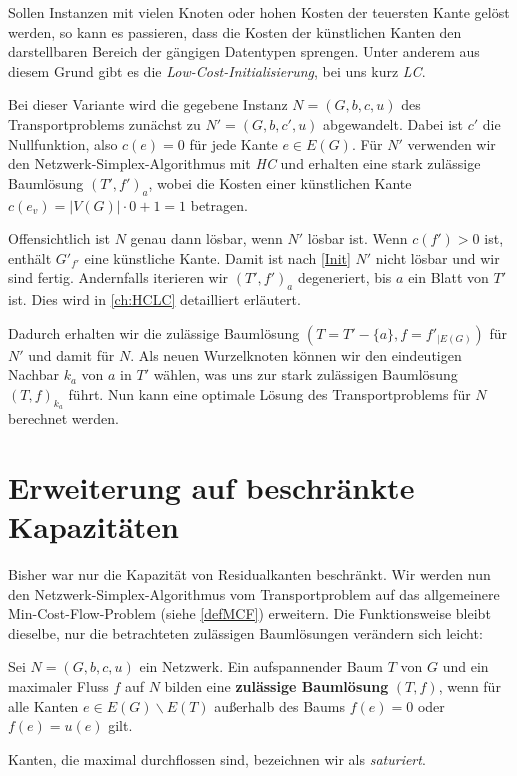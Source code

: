 Sollen Instanzen mit vielen Knoten oder hohen Kosten der teuersten Kante gelöst werden, so kann es passieren, dass die Kosten der künstlichen Kanten den darstellbaren Bereich der gängigen Datentypen sprengen. Unter anderem aus diesem Grund gibt es die \emph{Low-Cost-Initialisierung}, bei uns kurz \emph{LC}.

Bei dieser Variante wird die gegebene Instanz $N=(G,b,c,u)$ des Transportproblems zunächst zu $N'=(G,b,c',u)$ abgewandelt. Dabei ist $c'$ die Nullfunktion, also $c(e)=0$ für jede Kante $e\in E(G)$. Für $N'$ verwenden wir den Netzwerk-Simplex-Algorithmus mit \emph{HC} und erhalten eine stark zulässige Baumlösung $(T',f')_a$, wobei die Kosten einer künstlichen Kante $c(e_v)=|V(G)|\cdot0+1=1$ betragen.

Offensichtlich ist $N$ genau dann lösbar, wenn $N'$ lösbar ist. Wenn $c(f')>0$ ist, enthält $G'_{f'}$ eine künstliche Kante. Damit ist nach \cref{Init} $N'$ nicht lösbar und wir sind fertig. Andernfalls iterieren wir $(T',f')_a$ degeneriert, bis $a$ ein Blatt von $T'$ ist. Dies wird in \cref{ch:HCLC} detailliert erläutert.

Dadurch erhalten wir die zulässige Baumlösung $(T=T'-\{a\}, f=f'_{|E(G)})$ für $N'$ und damit für $N$. Als neuen Wurzelknoten können wir den eindeutigen Nachbar $k_a$ von $a$ in $T'$ wählen, was uns zur stark zulässigen Baumlösung $(T,f)_{k_a}$ führt. Nun kann eine optimale Lösung des Transportproblems für $N$ berechnet werden.

\section{Erweiterung auf beschränkte Kapazitäten}\label{ch:alg2}
Bisher war nur die Kapazität von Residualkanten beschränkt. Wir werden nun den Netzwerk-Simplex-Algorithmus vom Transportproblem auf das allgemeinere Min-Cost-Flow-Problem (siehe \cref{defMCF}) erweitern. Die Funktionsweise bleibt dieselbe, nur die betrachteten zulässigen Baumlösungen verändern sich leicht:

\begin{defn}Sei $N=(G,b,c,u)$ ein Netzwerk. Ein aufspannender Baum $T$ von $G$ und ein maximaler Fluss $f$ auf $N$ bilden eine \textbf{zulässige Baumlösung} $(T,f)$, wenn für alle Kanten $e\in E(G)\backslash E(T)$ außerhalb des Baums $f(e) = 0$ oder $f(e)=u(e)$ gilt.\end{defn}
\begin{anm}Kanten, die maximal durchflossen sind, bezeichnen wir als \emph{saturiert}.\end{anm}


